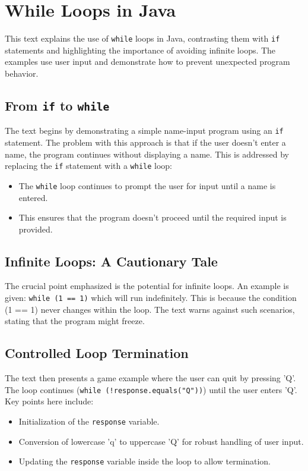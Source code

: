 \documentclass{article}
\begin{document}
\section{While Loops in Java}

This text explains the use of \texttt{while} loops in Java, contrasting them with \texttt{if} statements and highlighting the importance of avoiding infinite loops.  The examples use user input and demonstrate how to prevent unexpected program behavior.

\subsection{From \texttt{if} to \texttt{while}}

The text begins by demonstrating a simple name-input program using an \texttt{if} statement.  The problem with this approach is that if the user doesn't enter a name, the program continues without displaying a name.  This is addressed by replacing the \texttt{if} statement with a \texttt{while} loop:

\begin{itemize}
    \item  The \texttt{while} loop continues to prompt the user for input until a name is entered.
    \item This ensures that the program doesn't proceed until the required input is provided.
\end{itemize}

\subsection{Infinite Loops: A Cautionary Tale}

The crucial point emphasized is the potential for infinite loops.  An example is given: \texttt{while (1 == 1)} which will run indefinitely.  This is because the condition (1 == 1) never changes within the loop.  The text warns against such scenarios, stating that the program might freeze.

\subsection{Controlled Loop Termination}

The text then presents a game example where the user can quit by pressing 'Q'.  The loop continues (\texttt{while (!response.equals("Q"))}) until the user enters 'Q'.  Key points here include:

\begin{itemize}
    \item  Initialization of the \texttt{response} variable.
    \item  Conversion of lowercase 'q' to uppercase 'Q' for robust handling of user input.
    \item  Updating the \texttt{response} variable inside the loop to allow termination.
\end{itemize}
\end{document}
